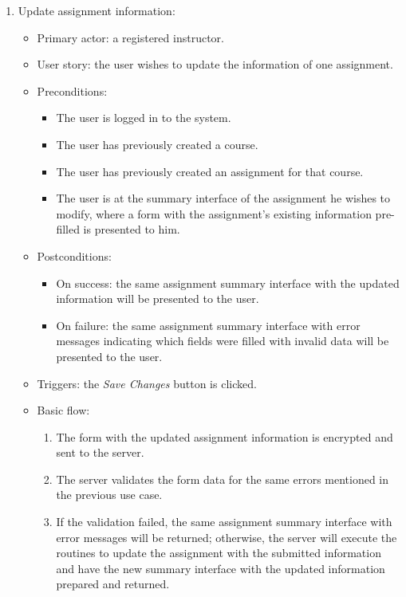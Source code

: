 \begin{enumerate}
\item Update assignment information:
\begin{itemize}
    \item Primary actor: a registered instructor.
    \item User story: the user wishes to update the information of one
        assignment.
    \item Preconditions:
        \begin{itemize}
            \item The user is logged in to the system.
            \item The user has previously created a course.
            \item The user has previously created an assignment for that course.
            \item The user is at the summary interface of the assignment he
                wishes to modify, where a form with the assignment's existing
                information pre-filled is presented to him.
        \end{itemize}
    \item Postconditions:
        \begin{itemize}
            \item On success: the same assignment summary interface with the updated
                information will be presented to the user.
            \item On failure: the same assignment summary interface with error
                messages indicating which fields were filled with invalid data will
                be presented to the user.
        \end{itemize}
    \item Triggers: the \emph{Save Changes} button is clicked.
    \item Basic flow:
        \begin{enumerate}
            \item The form with the updated assignment information is encrypted
                and sent to the server.
            \item The server validates the form data for the same errors
                mentioned in the previous use case.
            \item If the validation failed, the same assignment summary interface
                with error messages will be returned; otherwise, the server will
                execute the routines to update the assignment with the submitted
                information and have the new summary interface with the updated
                information prepared and returned.
        \end{enumerate}
\end{itemize}


\end{enumerate}
